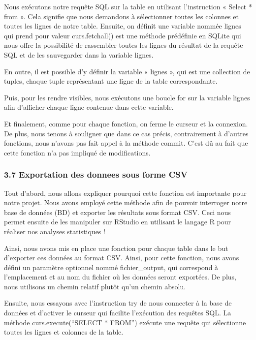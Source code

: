 \documentclass[
]{article}
\begin{document}
Nous exécutons notre requête SQL sur la table en utilisant l'instruction
« Select * from ». Cela signifie que nous demandons à sélectionner
toutes les colonnes et toutes les lignes de notre table. Ensuite, on
définit une variable nommée lignes qui prend pour valeur curs.fetchall()
est une méthode prédéfinie en SQLite qui nous offre la possibilité de
rassembler toutes les lignes du résultat de la requête SQL et de les
sauvegarder dans la variable lignes.

En outre, il est possible d'y définir la variable « lignes », qui est
une collection de tuples, chaque tuple représentant une ligne de la
table correspondante.

Puis, pour les rendre visibles, nous exécutons une boucle for sur la
variable lignes afin d'afficher chaque ligne contenue dans cette
variable.

Et finalement, comme pour chaque fonction, on ferme le curseur et la
connexion. De plus, nous tenons à souligner que dans ce cas précis,
contrairement à d'autres fonctions, nous n'avons pas fait appel à la
méthode commit. C'est dû au fait que cette fonction n'a pas impliqué de
modifications.

\subsubsection{3.7 Exportation des donnees sous forme
CSV}\label{exportation-des-donnees-sous-forme-csv}

Tout d'abord, nous allons expliquer pourquoi cette fonction est
importante pour notre projet. Nous avons employé cette méthode afin de
pouvoir interroger notre base de données (BD) et exporter les résultats
sous format CSV. Ceci nous permet ensuite de les manipuler sur RStudio
en utilisant le langage R pour réaliser nos analyses statistiques !

Ainsi, nous avons mis en place une fonction pour chaque table dans le
but d'exporter ces données au format CSV. Ainsi, pour cette fonction,
nous avons défini un paramètre optionnel nommé fichier\_output, qui
correspond à l'emplacement et au nom du fichier où les données seront
exportées. De plus, nous utilisons un chemin relatif plutôt qu'un chemin
absolu.

Ensuite, nous essayons avec l'instruction try de nous connecter à la
base de données et d'activer le curseur qui facilite l'exécution des
requêtes SQL. La méthode curs.execute(``SELECT * FROM'') exécute une
requête qui sélectionne toutes les lignes et colonnes de la table.
\end{document}
